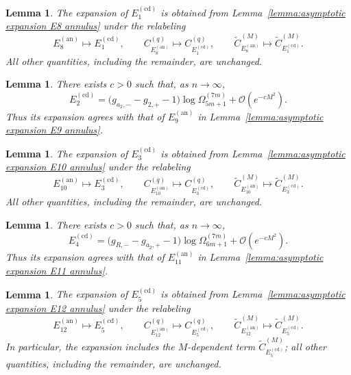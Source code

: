 \documentclass[a4paper]{article}
\newtheorem{lemma}[theorem]{Lemma}
\numberwithin{equation}{section}
\begin{document}
\begin{lemma}\label{lemma:asymptotic expansion E1 counting centered disk}
The expansion of $E_{1}^{(\mathrm{cd})}$ is obtained from
Lemma~\ref{lemma:asymptotic expansion E8 annulus} under the relabeling
\[
E_{8}^{(\mathrm{an})}\mapsto E_{1}^{(\mathrm{cd})},\qquad
C_{E_{8}^{(\mathrm{an})}}^{(q)}\mapsto
C_{E_{1}^{(\mathrm{cd})}}^{(q)},\qquad
\widetilde C_{E_{8}^{(\mathrm{an})}}^{(M)}\mapsto
\widetilde C_{E_{1}^{(\mathrm{cd})}}^{(M)}.
\]
All other quantities, including the remainder, are unchanged.
\end{lemma}



\begin{lemma}\label{lemma:asymptotic expansion E2 counting centered disk}
There exists $c>0$ such that, as $n\to\infty$,
\[
E_{2}^{(\mathrm{cd})}
=\bigl(g_{a_2,-}-g_{2,+}-1\bigr)\log\Omega_{5m+1}^{(7m)}
+\mathcal{O}(e^{-cM^2}).
\]
Thus its expansion agrees with that of $E_{9}^{(\mathrm{an})}$ in
Lemma~\ref{lemma:asymptotic expansion E9 annulus}.
\end{lemma}



\begin{lemma}\label{lemma:asymptotic expansion E3 counting centered disk}
The expansion of $E_{3}^{(\mathrm{cd})}$ is obtained from
Lemma~\ref{lemma:asymptotic expansion E10 annulus} under the relabeling
\[
E_{10}^{(\mathrm{an})}\mapsto E_{3}^{(\mathrm{cd})},\qquad
C_{E_{10}^{(\mathrm{an})}}^{(q)}\mapsto
C_{E_{3}^{(\mathrm{cd})}}^{(q)},\qquad
\widetilde C_{E_{10}^{(\mathrm{an})}}^{(M)}\mapsto
\widetilde C_{E_{3}^{(\mathrm{cd})}}^{(M)}.
\]
All other quantities, including the remainder, are unchanged.
\end{lemma}



\begin{lemma}\label{lemma:asymptotic expansion E4 centered disk}
There exists $c>0$ such that, as $n\to\infty$,
\[
E_{4}^{(\mathrm{cd})}
=\bigl(g_{R,-}-g_{a_2,+}-1\bigr)\log\Omega_{6m+1}^{(7m)}
+\mathcal{O}(e^{-cM^2}).
\]
Thus its expansion agrees with that of $E_{11}^{(\mathrm{an})}$ in
Lemma~\ref{lemma:asymptotic expansion E11 annulus}.
\end{lemma}









\begin{lemma}\label{lemma:asymptotic expansion E5 counting centered disk}
The expansion of $E_{5}^{(\mathrm{cd})}$ is obtained from
Lemma~\ref{lemma:asymptotic expansion E12 annulus} under the relabeling
\[
E_{12}^{(\mathrm{an})}\mapsto E_{5}^{(\mathrm{cd})},\qquad
C_{E_{12}^{(\mathrm{an})}}^{(q)}\mapsto
C_{E_{5}^{(\mathrm{cd})}}^{(q)},\qquad
\widetilde C_{E_{12}^{(\mathrm{an})}}^{(M)}\mapsto
\widetilde C_{E_{5}^{(\mathrm{cd})}}^{(M)}.
\]
In particular, the expansion includes the $M$-dependent term
$\widetilde C_{E_{5}^{(\mathrm{cd})}}^{(M)}$; all other quantities,
including the remainder, are unchanged.
\end{lemma}
\end{document}
